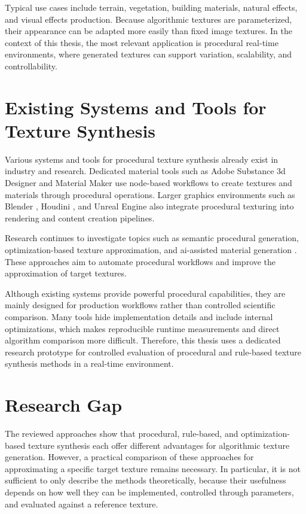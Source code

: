 Typical use cases include terrain, vegetation, building materials, natural effects, and visual effects production. Because algorithmic textures are parameterized, their appearance can be adapted more easily than fixed image textures. In the context of this thesis, the most relevant application is procedural real-time environments, where generated textures can support variation, scalability, and controllability.

\section{Existing Systems and Tools for Texture Synthesis}

Various systems and tools for procedural texture synthesis already exist in industry and research. Dedicated material tools such as Adobe Substance \gls{3d} Designer \cite{substance_designer} and Material Maker \cite{material_maker} use node-based workflows to create textures and materials through procedural operations. Larger graphics environments such as Blender \cite{blender}, Houdini \cite{houdini}, and Unreal Engine \cite{unreal_engine} also integrate procedural texturing into rendering and content creation pipelines.

\clearpage
Research continues to investigate topics such as semantic procedural generation, optimization-based texture approximation, and \gls{ai}-assisted material generation \cite{wang2017semantic}. These approaches aim to automate procedural workflows and improve the approximation of target textures.

Although existing systems provide powerful procedural capabilities, they are mainly designed for production workflows rather than controlled scientific comparison. Many tools hide implementation details and include internal optimizations, which makes reproducible runtime measurements and direct algorithm comparison more difficult. Therefore, this thesis uses a dedicated research prototype for controlled evaluation of procedural and rule-based texture synthesis methods in a real-time environment.

\section{Research Gap}

The reviewed approaches show that procedural, rule-based, and optimization-based texture synthesis each offer different advantages for algorithmic texture generation. However, a practical comparison of these approaches for approximating a specific target texture remains necessary. In particular, it is not sufficient to only describe the methods theoretically, because their usefulness depends on how well they can be implemented, controlled through parameters, and evaluated against a reference texture.

